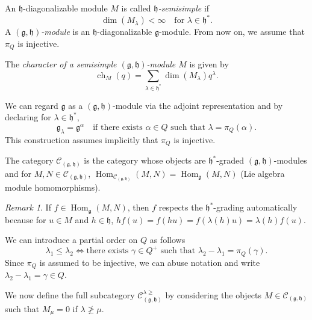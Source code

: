 \documentclass[a4paper, 12pt, reqno]{amsart}
\theoremstyle{remark}
\newtheorem{remark}[theorem]{Remark}
\DeclareMathOperator{\ch}{ch}
\DeclareMathOperator{\Hom}{Hom}
\begin{document}
An $\mathfrak{h}$-diagonalizable module $M$ is called \emph{$\mathfrak{h}$-semisimple} if
\begin{equation*}
  \dim(M_{\lambda}) < \infty \quad \text{for $\lambda \in \mathfrak{h}^*$}.
\end{equation*}
A \emph{$(\mathfrak{g}, \mathfrak{h})$-module} is an $\mathfrak{h}$-diagonalizable $\mathfrak{g}$-module.
From now on, we assume that $\pi_Q$ is injective.

The \emph{character of a semisimple $(\mathfrak{g}, \mathfrak{h})$-module $M$} is given by
\begin{equation*}
  \ch_M(q) = \sum_{\lambda \in \mathfrak{h}^*}\dim(M_{\lambda})q^{\lambda}.
\end{equation*}

We can regard $\mathfrak{g}$ as a $(\mathfrak{g}, \mathfrak{h})$-module via the adjoint representation and by declaring for $\lambda \in \mathfrak{h}^*$,
\begin{equation*}
  \mathfrak{g}_{\lambda} = \mathfrak{g}^{\alpha} \quad \text{if there exists $\alpha \in Q$ such that $\lambda = \pi_Q(\alpha)$}.
\end{equation*}
This construction assumes implicitly that $\pi_Q$ is injective.

The category $\mathcal{C}_{(\mathfrak{g}, \mathfrak{h})}$ is the category whose objects are $\mathfrak{h}^*$-graded $(\mathfrak{g}, \mathfrak{h})$-modules and for $M, N \in \mathcal{C}_{(\mathfrak{g}, \mathfrak{h})}$, $\Hom_{\mathcal{C}_{(\mathfrak{g}, \mathfrak{h})}}(M, N) = \Hom_{\mathfrak{g}}(M, N)$ (Lie algebra module homomorphisms).

\begin{remark}
  \label{rmk:1}
  If $f \in \Hom_{\mathfrak{g}}(M, N)$, then $f$ respects the $\mathfrak{h}^*$-grading automatically because for $u \in M$ and $h \in \mathfrak{h}$, $hf(u) = f(hu) = f(\lambda(h)u) = \lambda(h)f(u)$.
\end{remark}

We can introduce a partial order on $Q$ as follows
\begin{equation*}
  \lambda_1 \le \lambda_2 \iff \text{there exists $\gamma \in Q^+$ such that $\lambda_2 - \lambda_1 = \pi_Q(\gamma)$.}
\end{equation*}
Since $\pi_Q$ is assumed to be injective, we can abuse notation and write $\lambda_2 - \lambda_1 = \gamma \in Q$.

We now define the full subcategory $\mathcal{C}^{\lambda \ge}_{(\mathfrak{g}, \mathfrak{h})}$ by considering the objects $M \in \mathcal{C}_{(\mathfrak{g}, \mathfrak{h})}$ such that $M_{\mu} = 0$ if $\lambda \ngeq \mu$.
\end{document}
